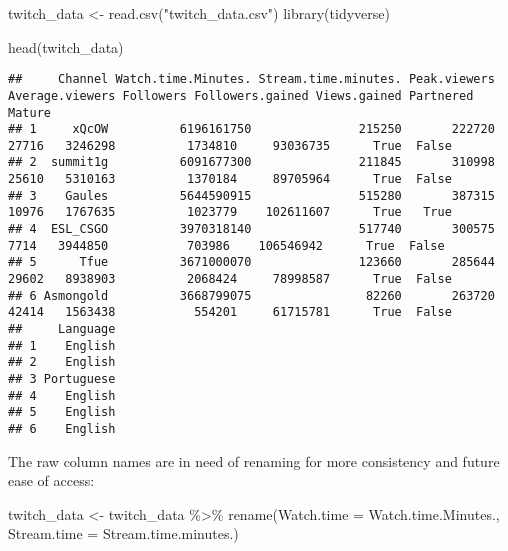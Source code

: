 \documentclass[
]{article}
\newenvironment{Shaded}{\begin{snugshade}}{\end{snugshade}}
\newcommand{\AttributeTok}[1]{\textcolor[rgb]{0.77,0.63,0.00}{#1}}
\newcommand{\FunctionTok}[1]{\textcolor[rgb]{0.00,0.00,0.00}{#1}}
\newcommand{\NormalTok}[1]{#1}
\newcommand{\OtherTok}[1]{\textcolor[rgb]{0.56,0.35,0.01}{#1}}
\newcommand{\SpecialCharTok}[1]{\textcolor[rgb]{0.00,0.00,0.00}{#1}}
\newcommand{\StringTok}[1]{\textcolor[rgb]{0.31,0.60,0.02}{#1}}
\begin{document}
\begin{Shaded}
\begin{Highlighting}[]
\NormalTok{twitch\_data }\OtherTok{\textless{}{-}} \FunctionTok{read.csv}\NormalTok{(}\StringTok{"twitch\_data.csv"}\NormalTok{)}
\FunctionTok{library}\NormalTok{(tidyverse)}
\end{Highlighting}
\end{Shaded}

\begin{Shaded}
\begin{Highlighting}[]
\FunctionTok{head}\NormalTok{(twitch\_data)}
\end{Highlighting}
\end{Shaded}

\begin{verbatim}
##     Channel Watch.time.Minutes. Stream.time.minutes. Peak.viewers Average.viewers Followers Followers.gained Views.gained Partnered Mature
## 1     xQcOW          6196161750               215250       222720           27716   3246298          1734810     93036735      True  False
## 2  summit1g          6091677300               211845       310998           25610   5310163          1370184     89705964      True  False
## 3    Gaules          5644590915               515280       387315           10976   1767635          1023779    102611607      True   True
## 4  ESL_CSGO          3970318140               517740       300575            7714   3944850           703986    106546942      True  False
## 5      Tfue          3671000070               123660       285644           29602   8938903          2068424     78998587      True  False
## 6 Asmongold          3668799075                82260       263720           42414   1563438           554201     61715781      True  False
##     Language
## 1    English
## 2    English
## 3 Portuguese
## 4    English
## 5    English
## 6    English
\end{verbatim}

The raw column names are in need of renaming for more consistency and
future ease of access:

\begin{Shaded}
\begin{Highlighting}[]
\NormalTok{twitch\_data }\OtherTok{\textless{}{-}}\NormalTok{ twitch\_data }\SpecialCharTok{\%\textgreater{}\%} 
  \FunctionTok{rename}\NormalTok{(}\AttributeTok{Watch.time =}\NormalTok{ Watch.time.Minutes., }\AttributeTok{Stream.time =}\NormalTok{ Stream.time.minutes.)}
\end{Highlighting}
\end{Shaded}
\end{document}
